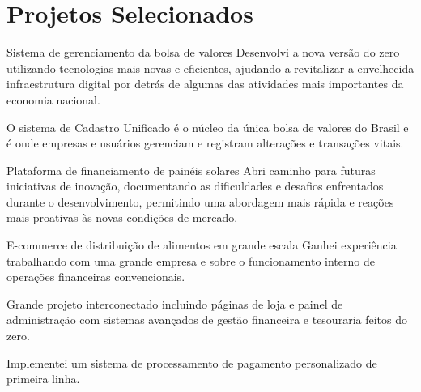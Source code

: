 \section{Projetos Selecionados}

\begin{experience}{Sistema de gerenciamento da bolsa de valores}{
}
Desenvolvi a nova versão do zero utilizando tecnologias mais novas e eficientes, ajudando a revitalizar a envelhecida infraestrutura digital por detrás de algumas das atividades mais importantes da economia nacional.

\begin{contribs}
	\item{O sistema de Cadastro Unificado é o núcleo da única bolsa de valores do Brasil e é onde empresas e usuários gerenciam e registram alterações e transações vitais.}
\end{contribs}
\end{experience}

\begin{experience}{Plataforma de financiamento de painéis solares}{
}
Abri caminho para futuras iniciativas de inovação, documentando as dificuldades e desafios enfrentados durante o desenvolvimento, permitindo uma abordagem mais rápida e reações mais proativas às novas condições de mercado.
\end{experience}

\begin{experience}{E-commerce de distribuição de alimentos em grande escala}{
}
Ganhei experiência trabalhando com uma grande empresa e sobre o funcionamento interno de operações financeiras convencionais.

\begin{contribs}
	\item{Grande projeto interconectado incluindo páginas de loja e painel de administração com sistemas avançados de gestão financeira e tesouraria feitos do zero.}
	\item{Implementei um sistema de processamento de pagamento personalizado de primeira linha.}
\end{contribs}
\end{experience}
